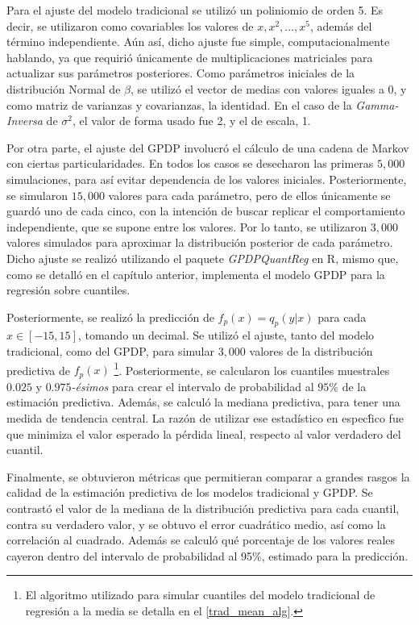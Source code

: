 Para el ajuste del modelo tradicional se utiliz\'o un poliniomio de orden 5. Es decir, se utilizaron como covariables los valores de $x, x^2, \ldots, x^5$, adem\'as del t\'ermino independiente. A\'un as\'i, dicho ajuste fue simple, computacionalmente hablando, ya que requiri\'o \'unicamente de multiplicaciones matriciales para actualizar sus par\'ametros posteriores. Como par\'ametros iniciales de la distribuci\'on Normal de $\beta$, se utiliz\'o el vector de medias con valores iguales a 0, y como matriz de varianzas y covarianzas, la identidad. En el caso de la \textit{Gamma-Inversa} de $\sigma^2$, el valor de forma usado fue 2, y el de escala, 1.

Por otra parte, el ajuste del GPDP involucr\'o el c\'alculo de una cadena de Markov con ciertas particularidades. En todos los casos se desecharon las primeras $5,000$ simulaciones, para as\'i evitar dependencia de los valores iniciales. Posteriormente, se simularon $15,000$ valores para cada par\'ametro, pero de ellos \'unicamente se guard\'o uno de cada cinco, con la intenci\'on de buscar replicar el comportamiento independiente, que se supone entre los valores. Por lo tanto, se utilizaron $3,000$ valores simulados para aproximar la distribuci\'on posterior de cada par\'ametro. Dicho ajuste se realiz\'o utilizando el paquete \textit{GPDPQuantReg} en R, mismo que, como se detalló en el cap\'itulo anterior, implementa el modelo GPDP para la regresi\'on sobre cuantiles.

Posteriormente, se realiz\'o la predicci\'on de $f_p(x) = q_p(y|x)$ para cada $x \in [-15,15]$, tomando un decimal. Se utiliz\'o el ajuste, tanto del modelo tradicional, como del GPDP, para simular $3,000$ valores de la distribuci\'on predictiva de $f_p(x)$ \footnote{El algoritmo utilizado para simular cuantiles del modelo tradicional de regresi\'on a la media se detalla en el \autoref{trad_mean_alg}.}. Posteriormente, se calcularon los cuantiles muestrales $0.025$ y $0.975$\textit{-\'esimos} para crear el intervalo de probabilidad al $95\%$ de la estimaci\'on predictiva. Adem\'as, se calcul\'o la mediana predictiva, para tener una medida de tendencia central. La raz\'on de utilizar ese estad\'istico en espec\'fico fue que minimiza el valor esperado la p\'erdida lineal, respecto al valor verdadero del cuantil.

Finalmente, se obtuvieron m\'etricas que permitieran comparar a grandes rasgos la calidad de la estimaci\'on predictiva de los modelos tradicional y GPDP. Se contrast\'o el valor de la mediana de la distribuci\'on predictiva para cada cuantil, contra su verdadero valor, y se obtuvo el error cuadr\'atico medio, as\'i como la correlaci\'on al cuadrado. Adem\'as se calcul\'o qu\'e porcentaje de los valores reales cayeron dentro del intervalo de probabilidad al 95\%, estimado para la predicci\'on.

